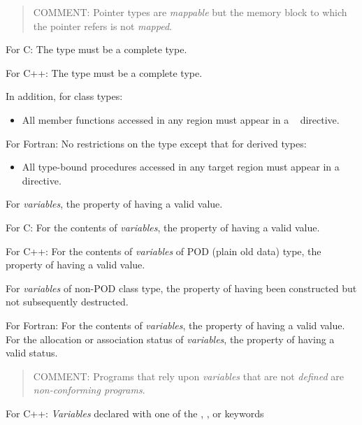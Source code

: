 \begin{quote}
COMMENT: Pointer types are \emph{mappable} but the memory block to which the pointer refers is not \emph{mapped}.
\end{quote}

For C:
\nopagebreak
The type must be a complete type.

For C++:
\nopagebreak
The type must be a complete type.

In addition, for class types:
\begin{itemize}
\item All member functions accessed in any  region must appear in a
~ directive.
\end{itemize}

For Fortran:
\nopagebreak
No restrictions on the type except that for derived types:

\begin{itemize}
\item All type-bound procedures accessed in any target region must appear in a ~ directive.
\end{itemize}
\glossarydefend

\glossarydefstart
For \emph{variables}, the property of having a valid value.

For C:
\nopagebreak
For the contents of \emph{variables}, the property of having a valid value.

For C++:
\nopagebreak
For the contents of \emph{variables} of POD (plain old data) type, the property of having
a valid value.

For \emph{variables} of non-POD class type, the property of having been constructed but
not subsequently destructed.

For Fortran:
\nopagebreak
For the contents of \emph{variables}, the property of having a valid value. For the
allocation or association status of \emph{variables}, the property of having a valid status.

\begin{quote}
COMMENT: Programs that rely upon \emph{variables} that are not \emph{defined} are \emph{non-conforming programs}.
\end{quote}
\glossarydefend

\glossarydefstart
For C++: \emph{Variables} declared with one of the , , or  keywords
\glossarydefend





